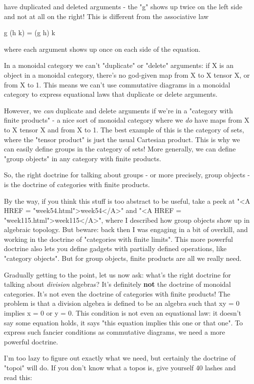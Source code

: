have duplicated and deleted arguments - the "g" shows up twice
on the left side and not at all on the right!  This is different from
the associative law

g (h k) = (g h) k

where each argument shows up once on each side of the equation.

In a monoidal category we can't "duplicate" or
"delete" arguments: if X is an object in a monoidal category,
there's no god-given map from X to X tensor X, or from X to 1.  This
means we can't use commutative diagrams in a monoidal category to
express equational laws that duplicate or delete arguments.

However, we \emph{can} duplicate and delete arguments if we're in a
"category with finite products" - a nice sort of monoidal
category where we \emph{do} have maps from X to X tensor X and from X to 1.
The best example of this is the category of sets, where the "tensor
product" is just the usual Cartesian product.  This is why we can
easily define groups in the category of sets!  More generally, we can
define "group objects" in any category with finite products.

So, the right doctrine for talking about groups - or more precisely,
group objects - is the doctrine of categories with finite products.  

By the way, if you think this stuff is too abstract to be useful, take a
peek at "<A HREF = "week54.html">week54</A>" and "<A HREF
= "week115.html">week115</A>", where I described how group objects
show up in algebraic topology.  But beware: back then I was engaging in
a bit of overkill, and working in the doctrine of "categories with
finite limits".  This more powerful doctrine also lets you define
gadgets with partially defined operations, like "category
objects".  But for group objects, finite products are all we really
need.

Gradually getting to the point, let us now ask: what's the right
doctrine for talking about \emph{division} algebras?  It's definitely 
\textbf{not} the
doctrine of monoidal categories.  It's not even the doctrine of
categories with finite products!  The problem is that a division algebra
is defined to be an algebra such that xy = 0 implies x = 0 or y = 0.
This condition is not even an equational law: it doesn't say some
equation holds, it says "this equation implies this one or that one".
To express such fancier conditions as commutative diagrams, we need a
more powerful doctrine.  

I'm too lazy to figure out exactly what we need, but certainly the
doctrine of "topoi" will do.  If you don't know what a topos is, give
yourself 40 lashes and read this:

